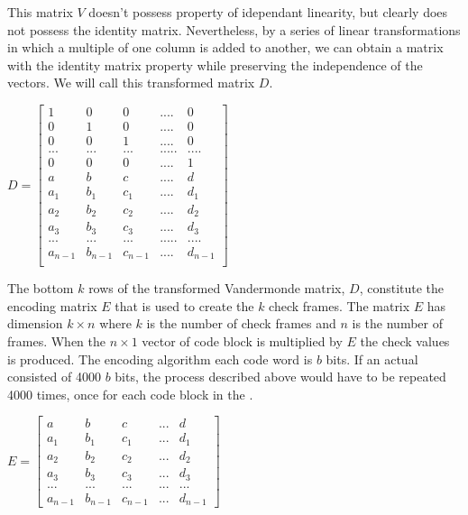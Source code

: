 This matrix $V$ doesn't possess property of idependant linearity, but clearly
does not possess the identity matrix. Nevertheless, by a series of linear transformations in which a multiple of one
column is added to another, we can obtain a matrix with the identity matrix
property  while preserving the independence of the vectors. We will call this transformed matrix $D$.

\vspace{0.5cm}
\begin{center}
$D= 
\begin{bmatrix} 

1 & 0 & 0 & .... & 0 \\ 
0 & 1 & 0 & .... & 0  \\
0 & 0 & 1 & .... & 0 \\ 
... & ... & ...  & .....& ....\\
0 & 0 & 0 & .... & 1\\ 
a & b & c & .... & d \\
a_1 & b_1 & c_1 & .... & d_1 \\
a_2 & b_2 & c_2 & .... & d_2 \\
a_3 & b_3 & c_3 & .... & d_3 \\
... & ... & ...  & .....& ....\\
a_{n-1} & b_{n-1} & c_{n-1} & .... & d_{n-1} \\

\end{bmatrix}$
\end{center}
\vspace{0.5cm}


The bottom $k$ rows of the transformed Vandermonde matrix, $D$, constitute the encoding matrix $E$ that is used to create the $k$ check frames. The matrix $E$ has dimension $k \times n$ where $k$ is the number of check frames and $n$ is the number of \ControlMessage frames. When the $n \times 1$ vector of code block is multiplied by $E$ the check values is produced. The encoding algorithm each code word is $b$ bits. If an actual \ControlMessage consisted of 4000 $b$ bits, the process described above would have to be repeated 4000 times, once for each code block in the \ControlMessage.
\vspace{0.5cm}

\begin{center}
$E= 
\begin{bmatrix} 
a   & b   & c   & ... & d		\\
a_1 & b_1 & c_1 & ... & d_1 \\
a_2 & b_2 & c_2 & ... & d_2 \\
a_3 & b_3 & c_3 & ... & d_3 \\
... & ... & ... & ... & ...\\
a_{n-1} & b_{n-1} & c_{n-1} & ... & d_{n-1}
\end{bmatrix}$
\end{center}

